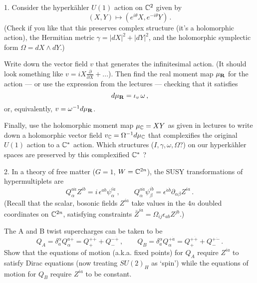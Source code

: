 1. Consider the hyperk\"ahler $U(1)$ action on $\mathbb{C}^2$ given by
%
$$ (X,Y) \mapsto (e^{i\theta}X,e^{-i\theta}Y)\,. $$
%
(Check if you like that this preserves complex structure (it's a holomorphic action), the Hermitian metric $\gamma = |dX|^2+|dY|^2$, and the holomorphic symplectic form $\Omega=dX\wedge dY$.)

Write down the vector field $v$ that generates the infinitesimal action. (It should look something like $v = i X\frac{\partial}{\partial X} + ...$). Then find the real moment map $\mu_{\mathbf{R}}$ for the action --- or use the expression from the lectures --- checking that it satisfies
%
$$  d\mu_{\mathbf{R}} = \iota_v \,\omega\,, $$
%
or, equivalently, $v = \omega^{-1} d\mu_{\mathbf{R}}$.

Finally, use the holomorphic moment map $\mu_{\mathbb{C}} = XY$ as given in lectures to write down a holomorphic vector field $v_{\mathbb{C}} = \Omega^{-1}d\mu_{\mathbb{C}}$ that complexifies the original $U(1)$ action to a $\mathbb{C}^*$ action. Which structures ($I,\gamma,\omega,\Omega$?) on our hyperk\"ahler spaces are preserved by this complexified $\mathbb{C}^*$ ?



2. In a theory of free matter ($G=1$, $W = \mathbb{C}^{2n}$), the SUSY transformations of hypermultiplets are
%
$$ Q_\alpha^{a\dot a} Z^{ib} = i\, \epsilon^{ab} \psi_\alpha^{i\dot a}\,,\qquad Q_\alpha^{a\dot a} \psi_\beta^{i\dot b} =  \epsilon^{\dot a \dot b} \partial_{\alpha\beta} Z^{i a}\,. $$
%
(Recall that the scalar, bosonic fields $Z^{ia}$ take values in the $4n$ doubled coordinates on $\mathbb{C}^{2n}$, satisfying constraints $\bar Z^{ia} = \Omega_{ij}\epsilon_{ab}Z^{jb}$.)

The A and B twist supercharges can be taken to be
%
$$ Q_A  = \delta^\alpha_a Q_\alpha^{a\dot +} = Q_+^{+\dot +} + Q_-^{-\dot +}\,,\qquad Q_B  = \delta^\alpha_{\dot a} Q_\alpha^{+\dot a} = Q_+^{+\dot +} + Q_-^{+\dot -}\,. $$
%
Show that the equations of motion (a.k.a. fixed points) for $Q_A$ require $Z^{ia}$ to satisfy Dirac equations (now treating $SU(2)_H$ as `spin') while the equations of motion for $Q_B$ require  $Z^{ia}$ to be constant.

